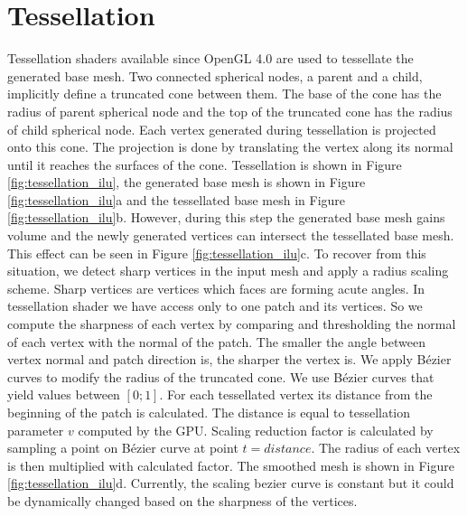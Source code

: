 \section{Tessellation}
Tessellation shaders available since OpenGL 4.0 are used to tessellate the generated base mesh.
Two connected spherical nodes, a parent and a child, implicitly define a truncated cone between them.
The base of the cone has the radius of parent spherical node and the top of the truncated cone has the radius of child spherical node.
Each vertex generated during tessellation is projected onto this cone.
The projection is done by translating the vertex along its normal until it reaches the surfaces of the cone.
Tessellation is shown in Figure \ref{fig:tessellation_ilu}, the generated base mesh is shown in Figure \ref{fig:tessellation_ilu}a and the tessellated base mesh in Figure \ref{fig:tessellation_ilu}b.
However, during this step the generated base mesh gains volume and the newly generated vertices can intersect the tessellated base mesh.
This effect can be seen in Figure \ref{fig:tessellation_ilu}c.
To recover from this situation, we detect sharp vertices in the input mesh and apply a radius scaling scheme.
Sharp vertices are vertices which faces are forming acute angles.
In tessellation shader we have access only to one patch and its vertices.
So we compute the sharpness of each vertex by comparing and thresholding the normal of each vertex with the normal of the patch.
The smaller the angle between vertex normal and patch direction is, the sharper the vertex is.
We apply Bézier curves to modify the radius of the truncated cone.
We use Bézier curves that yield values between $[0;1]$.
For each tessellated vertex its distance from the beginning of the patch is calculated.
The distance is equal to tessellation parameter $v$ computed by the GPU.
Scaling reduction factor is calculated by sampling a point on Bézier curve at point $t = distance$.
The radius of each vertex is then multiplied with calculated factor.
The smoothed mesh is shown in Figure \ref{fig:tessellation_ilu}d.
Currently, the scaling bezier curve is constant but it could be dynamically changed based on the sharpness of the vertices.

